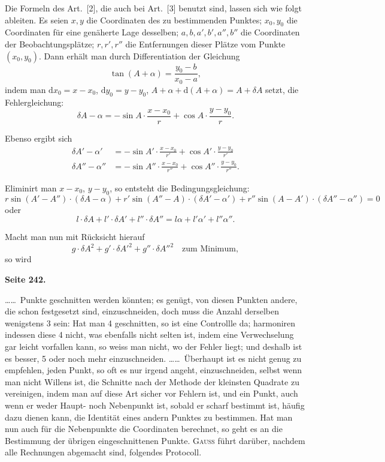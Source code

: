 \documentclass[12pt,a4paper]{article}
\newcommand{\tang}{\tan}
\theoremstyle{plain}
\theoremstyle{definition}
\theoremstyle{remark}
\begin{document}
Die Formeln des Art.~[2], die auch bei Art.~[3] benutzt sind, lassen sich wie folgt ableiten. Es seien $x, y$ die Coordinaten des zu bestimmenden Punktes; $x_0, y_0$ die Coordinaten für eine genäherte Lage desselben; $a, b, a', b', a'', b''$ die Coordinaten der Beobachtungsplätze; $r, r', r''$ die Entfernungen dieser Plätze vom Punkte $(x_0, y_0)$. Dann erhält man durch Differentiation der Gleichung
\[
\tang(A + \alpha) = \frac{y_0 - b}{x_0 - a},
\]
indem man $\mathrm{d}x_0 = x - x_0$, $\mathrm{d}y_0 = y - y_0$, $A + \alpha + \mathrm{d}(A + \alpha) = A + \delta A$ setzt, die Fehlergleichung:
\[
\delta A - \alpha = -\sin A \cdot \frac{x - x_0}{r} + \cos A \cdot \frac{y - y_0}{r}.
\]

Ebenso ergibt sich
\begin{align*}
\delta A' - \alpha' &= -\sin A' \cdot \frac{x - x_0}{r'} + \cos A' \cdot \frac{y - y_0}{r'} \\
\delta A'' - \alpha'' &= -\sin A'' \cdot \frac{x - x_0}{r''} + \cos A'' \cdot \frac{y - y_0}{r''}.
\end{align*}

Eliminirt man $x - x_0$, $y - y_0$, so entsteht die Bedingungsgleichung:
\[
r \sin(A' - A'') \cdot (\delta A - \alpha) + r' \sin(A'' - A) \cdot (\delta A' - \alpha') + r'' \sin(A - A') \cdot (\delta A'' - \alpha'') = 0
\]
oder
\[
l \cdot \delta A + l' \cdot \delta A' + l'' \cdot \delta A'' = l\alpha + l'\alpha' + l''\alpha''.
\]

Macht man nun mit Rücksicht hierauf
\[
g \cdot \delta A^2 + g' \cdot \delta A'^2 + g'' \cdot \delta A''^2 \quad \text{zum Minimum},
\]
so wird

\newpage
\textbf{Seite 242.}

\ldots\ldots\ Punkte geschnitten werden könnten; es genügt, von diesen Punkten andere, die schon festgesetzt sind, einzuschneiden, doch muss die Anzahl derselben wenigstens 3 sein: Hat man 4 geschnitten, so ist eine Controllle da; harmoniren indessen diese 4 nicht, was ebenfalls nicht selten ist, indem eine Verwechselung gar leicht vorfallen kann, so weiss man nicht, wo der Fehler liegt; und deshalb ist es besser, 5 oder noch mehr einzuschneiden. \ldots\ldots\ Überhaupt ist es nicht genug zu empfehlen, jeden Punkt, so oft es nur irgend angeht, einzuschneiden, selbst wenn man nicht Willens ist, die Schnitte nach der Methode der kleinsten Quadrate zu vereinigen, indem man auf diese Art sicher vor Fehlern ist, und ein Punkt, auch wenn er weder Haupt- noch Nebenpunkt ist, sobald er scharf bestimmt ist, häufig dazu dienen kann, die Identität eines andern Punktes zu bestimmen. Hat man nun auch für die Nebenpunkte die Coordinaten berechnet, so geht es an die Bestimmung der übrigen eingeschnittenen Punkte. \textsc{Gauß} führt darüber, nachdem alle Rechnungen abgemacht sind, folgendes Protocoll.
\end{document}
